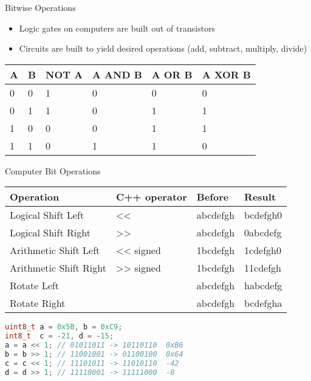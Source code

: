 \begin{withoutheadline}
\begin{frame}[fragile]{Bitwise Operations}
\begin{itemize}
    \item Logic gates on computers are built out of transistors
    \item Circuits are built to yield desired operations (add, subtract, multiply, divide)
\end{itemize}
\begin{tabular}{p{2cm}|p{2cm}|p{2cm}|p{2cm}|p{2cm}|p{2cm}}    \toprule
    A & B & NOT A & A AND B & A OR B & A XOR B \\ \midrule
    0 & 0 &     1 &       0 &      0 &       0 \\ 
    0 & 1 &     1 &       0 &      1 &       1 \\ 
    1 & 0 &     0 &       0 &      1 &       1 \\ 
    1 & 1 &     0 &       1 &      1 &       0 \\ \bottomrule
\end{tabular}
\end{frame}

\begin{frame}[fragile]{Computer Bit Operations}
\begin{tabular}{p{4cm}|p{2cm}|p{3cm}|p{3cm}}            \toprule
Operation              & C++ operator & Before & Result \\ \midrule
Logical Shift Left     & <<           & abcdefgh & bcdefgh0 \\
Logical Shift Right    & >>           & abcdefgh & 0abcdefg \\
Arithmetic Shift Left  & <<  signed   & 1bcdefgh & 1cdefgh0 \\
Arithmetic Shift Right & >>  signed   & 1bcdefgh & 11cdefgh \\
Rotate Left            &              & abcdefgh & habcdefg \\
Rotate Right           &              & abcdefgh & bcdefgha \\ \bottomrule
\end{tabular}
\begin{lstlisting}[language=c++,mathescape=true]
uint8_t a = 0x5B, b = 0xC9;
int8_t  c = -21, d = -15;
a = a << 1; // 01011011 -> 10110110  0xB6
b = b >> 1; // 11001001 -> 01100100  0x64
c = c << 1; // 11101011 -> 11010110  -42
d = d >> 1; // 11110001 -> 11111000  -8 
\end{lstlisting}
\end{frame}

\end{withoutheadline}
 
